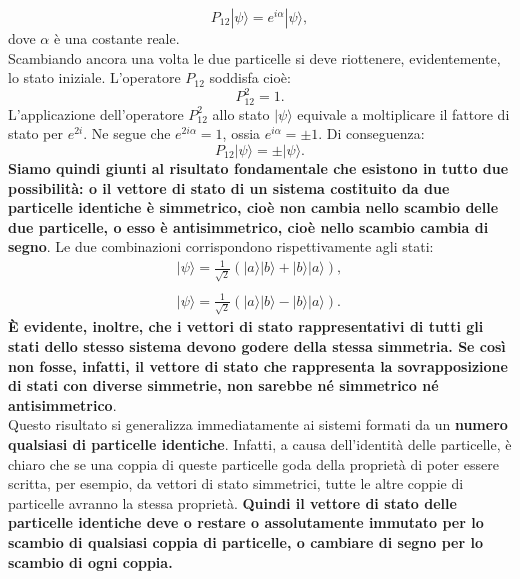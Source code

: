 \documentclass[a4paper,12pt,oneside]{book}
\begin{document}
\begin{equation}
P_{12}|\psi\rangle =  e^{i\alpha}|\psi\rangle,
\end{equation}
dove $\alpha$ è una costante reale.\\
Scambiando ancora una volta le due particelle si deve riottenere, evidentemente, lo stato iniziale. L'operatore $P_{12}$ soddisfa cioè:\\
\begin{equation}
P_{12}^2 = 1.
\end{equation}
L'applicazione dell'operatore $P_{12}^2$ allo stato $|\psi\rangle$ equivale a moltiplicare il fattore di stato per $e^{2i}$. Ne segue che $e^{2i\alpha} = 1 $, ossia $e^{i\alpha}=\pm1$. Di conseguenza:
\begin{equation}
P_{12} |\psi\rangle= \pm |\psi\rangle .
\end{equation}
\textbf{Siamo quindi giunti al risultato fondamentale che esistono in tutto due possibilità: o il vettore di stato di un sistema costituito da due particelle identiche è simmetrico, cioè non cambia nello scambio delle due particelle, o esso è antisimmetrico, cioè nello scambio cambia di segno}. Le due combinazioni corrispondono rispettivamente agli stati:
\begin{eqnarray}
\label{eq:cap20_4}
|\psi\rangle= \frac{1}{\sqrt{2}}\left(|a\rangle |b\rangle + |b\rangle|a\rangle \right) ,\nonumber \\
\\
|\psi\rangle= \frac{1}{\sqrt{2}}\left(|a\rangle |b\rangle - |b\rangle|a\rangle \right). \nonumber
\end{eqnarray}
\textbf{È evidente, inoltre, che i vettori di stato rappresentativi di tutti gli stati dello stesso sistema devono godere della stessa simmetria. Se così non fosse, infatti, il vettore di stato che rappresenta la sovrapposizione di stati con diverse simmetrie, non sarebbe né simmetrico né antisimmetrico}.\\
Questo risultato si generalizza immediatamente ai sistemi formati da un \textbf{numero qualsiasi di particelle identiche}. Infatti, a causa dell'identità delle particelle, è chiaro che se una coppia di queste particelle goda della proprietà di poter essere scritta, per esempio, da vettori di stato simmetrici, tutte le altre coppie di particelle avranno la stessa proprietà. \textbf{Quindi il vettore di stato delle particelle identiche deve o restare o assolutamente immutato per lo scambio di qualsiasi coppia di particelle, o cambiare di segno per lo scambio di ogni coppia.}\\
\end{document}
